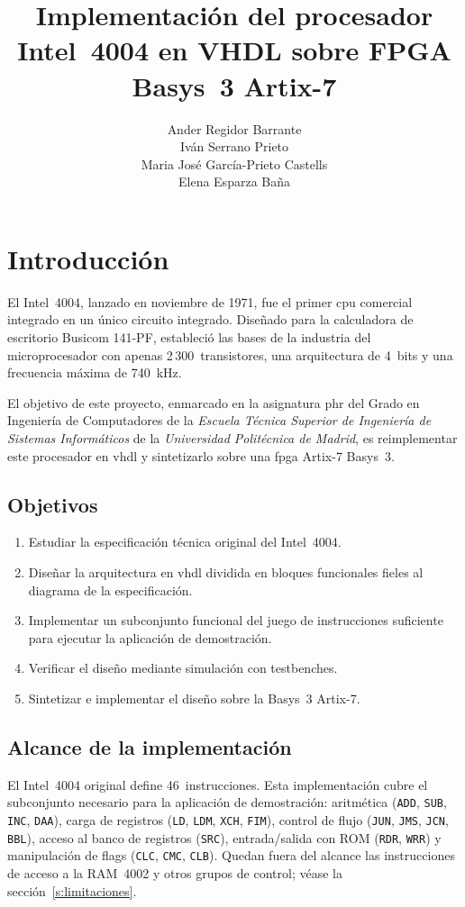 \documentclass[%
    school=etsisi,%
    type=pfg,%
    degree=61CI,%
]{upm-report}
\title{Implementación del procesador Intel~4004 en VHDL sobre FPGA Basys~3 Artix-7}
\author{%
    Ander Regidor Barrante\\
    Iván Serrano Prieto\\
    Maria José García-Prieto Castells\\
    Elena Esparza Baña%
}
\begin{document}
\chapter{Introducción}
\label{ch:introduccion}

El Intel~4004, lanzado en noviembre de 1971, fue el primer \acrfull{cpu}
comercial integrado en un único circuito integrado.  Diseñado para la
calculadora de escritorio Busicom 141-PF, estableció las bases de la industria
del microprocesador con apenas 2\,300~transistores, una arquitectura de 4~bits
y una frecuencia máxima de 740~kHz.

El objetivo de este proyecto, enmarcado en la asignatura \acrfull{phr} del
Grado en Ingeniería de Computadores de la \textit{Escuela Técnica Superior de
Ingeniería de Sistemas Informáticos} de la \textit{Universidad Politécnica de
Madrid}, es reimplementar este procesador en \acrshort{vhdl} y sintetizarlo
sobre una \acrshort{fpga} Artix-7 Basys~3.

\section{Objetivos}

\begin{enumerate}
    \item Estudiar la especificación técnica original del Intel~4004.
    \item Diseñar la arquitectura en \acrshort{vhdl} dividida en bloques
        funcionales fieles al diagrama de la especificación.
    \item Implementar un subconjunto funcional del juego de instrucciones
        suficiente para ejecutar la aplicación de demostración.
    \item Verificar el diseño mediante simulación con testbenches.
    \item Sintetizar e implementar el diseño sobre la Basys~3 Artix-7.
\end{enumerate}

\section{Alcance de la implementación}

El Intel~4004 original define 46~instrucciones.  Esta implementación cubre
el subconjunto necesario para la aplicación de demostración: aritmética
(\texttt{ADD}, \texttt{SUB}, \texttt{INC}, \texttt{DAA}), carga de registros
(\texttt{LD}, \texttt{LDM}, \texttt{XCH}, \texttt{FIM}), control de flujo
(\texttt{JUN}, \texttt{JMS}, \texttt{JCN}, \texttt{BBL}), acceso al banco de
registros (\texttt{SRC}), entrada/salida con ROM (\texttt{RDR}, \texttt{WRR})
y manipulación de flags (\texttt{CLC}, \texttt{CMC}, \texttt{CLB}).  Quedan
fuera del alcance las instrucciones de acceso a la RAM~4002 y otros grupos
de control; véase la sección~\ref{s:limitaciones}.
\end{document}
